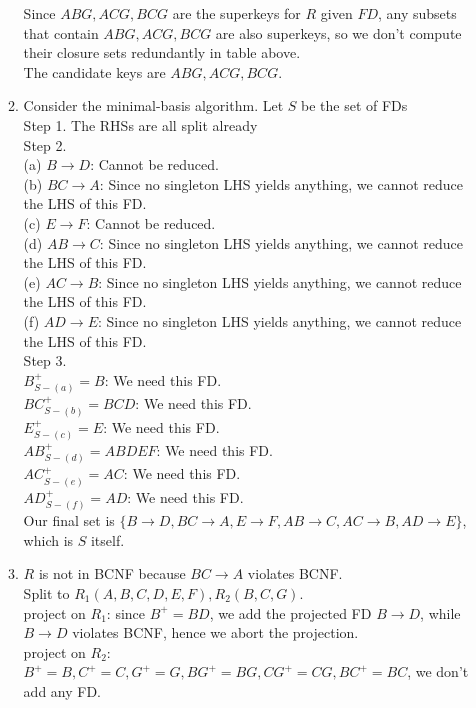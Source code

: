 \documentclass[letter, 9pt]{article}
\begin{document}
\begin{enumerate}
\begin{enumerate}
Since $ABG, ACG, BCG$ are the superkeys for $R$ given $FD$, any subsets that contain $ABG, ACG, BCG$ are also superkeys, so we don't compute their closure sets redundantly in table above. \\
The candidate keys are $ABG, ACG, BCG$. 
\item 
Consider the minimal-basis algorithm. Let $S$ be the set of FDs\\
    Step 1. The RHSs are all split already \\

    Step 2. \\ 
    (a) $B \rightarrow D$: Cannot be reduced.  \\
    (b) $BC\rightarrow A$: Since no singleton LHS yields anything, we cannot reduce the LHS of this FD.  \\
    (c) $E\rightarrow F$: Cannot be reduced.  \\
    (d) $AB\rightarrow C$: Since no singleton LHS yields anything, we cannot reduce the LHS of this FD.   \\
    (e) $AC\rightarrow B$: Since no singleton LHS yields anything, we cannot reduce the LHS of this FD.  \\
    (f) $AD\rightarrow E$: Since no singleton LHS yields anything, we cannot reduce the LHS of this FD. \\

    Step 3.\\
    $B^+_{S-(a)} = B$: We need this FD.   \\
    $BC^+_{S-(b)} = BCD$: We need this FD.  \\
    $E^+_{S-(c)} = E$: We need this FD.   \\
    $AB^+_{S-(d)} = ABDEF$: We need this FD.  \\
    $AC^+_{S-(e)} = AC$: We need this FD.  \\
    $AD^+_{S-(f)} = AD$: We need this FD. \\

Our final set is $\{B\rightarrow D, BC\rightarrow A, E\rightarrow F, AB\rightarrow C, AC\rightarrow B, AD\rightarrow E\}$, which is $S$ itself. 



\item 
$R$ is not in BCNF because $BC\rightarrow A$ violates BCNF.\\
Split to $R_1(A,B,C,D,E,F), R_2(B,C,G)$. \\
project on $R_1$: since $B^+ = BD$, we add the projected FD $B\rightarrow D$, while $B\rightarrow D$ violates BCNF, hence we abort the projection. \\
project on $R_2$: $B^+ = B, C^+=C, G^+ = G, BG^+= BG, CG^+=CG, BC^+= BC$, we don't add any FD. \\


\end{enumerate}
\end{enumerate}
\end{document}
